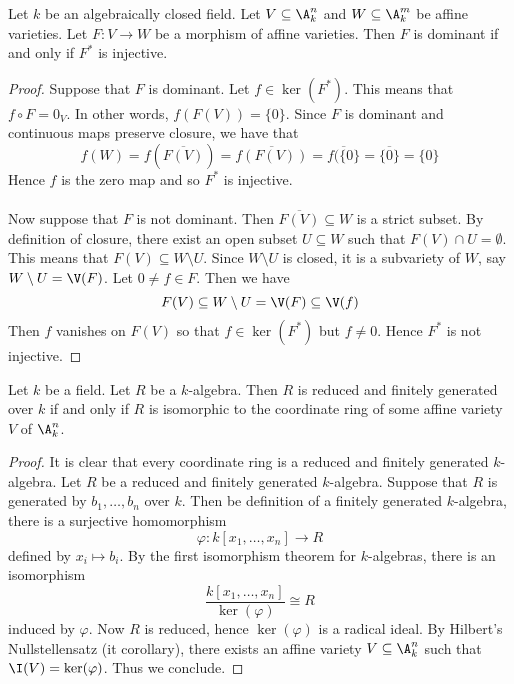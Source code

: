 \documentclass[a4paper]{article}
\begin{document}
\begin{lmm}{}{} Let $k$ be an algebraically closed field. Let $V\subseteq\A_k^n$ and $W\subseteq\A_k^m$ be affine varieties. Let $F:V\to W$ be a morphism of affine varieties. Then $F$ is dominant if and only if $F^\ast$ is injective. 
\begin{proof}
Suppose that $F$ is dominant. Let $f\in\ker(F^\ast)$. This means that $f\circ F=0_V$. In other words, $f(F(V))=\{0\}$. Since $F$ is dominant and continuous maps preserve closure, we have that $$f(W)=f(\overline{F(V)})=\overline{f(F(V))}=\overline{f(\{0\}}=\overline{\{0\}}=\{0\}$$ Hence $f$ is the zero map and so $F^\ast$ is injective. \\~\\

Now suppose that $F$ is not dominant. Then $\overline{F(V)}\subseteq W$ is a strict subset. By definition of closure, there exist an open subset $U\subseteq W$ such that $F(V)\cap U=\emptyset$. This means that $F(V)\subseteq W\setminus U$. Since $W\setminus U$ is closed, it is a subvariety of $W$, say $W\setminus U=\V(F)$. Let $0\neq f\in F$. Then we have $$F(V)\subseteq W\setminus U=\V(F)\subseteq\V(f)$$ Then $f$ vanishes on $F(V)$ so that $f\in\ker(F^\ast)$ but $f\neq 0$. Hence $F^\ast$ is not injective. 
\end{proof}
\end{lmm}

\begin{prp}{}{} Let $k$ be a field. Let $R$ be a $k$-algebra. Then $R$ is reduced and finitely generated over $k$ if and only if $R$ is isomorphic to the coordinate ring of some affine variety $V$ of $\A_k^n$. 
\begin{proof}
It is clear that every coordinate ring is a reduced and finitely generated $k$-algebra. Let $R$ be a reduced and finitely generated $k$-algebra. Suppose that $R$ is generated by $b_1,\dots,b_n$ over $k$. Then be definition of a finitely generated $k$-algebra, there is a surjective homomorphism $$\varphi:k[x_1,\dots,x_n]\to R$$ defined by $x_i\mapsto b_i$. By the first isomorphism theorem for $k$-algebras, there is an isomorphism $$\frac{k[x_1,\dots,x_n]}{\ker(\varphi)}\cong R$$ induced by $\varphi$. Now $R$ is reduced, hence $\ker(\varphi)$ is a radical ideal. By Hilbert's Nullstellensatz (it corollary), there exists an affine variety $V\subseteq\A_k^n$ such that $\I(V)=\ker(\varphi)$. Thus we conclude. 
\end{proof}
\end{prp}
\end{document}
